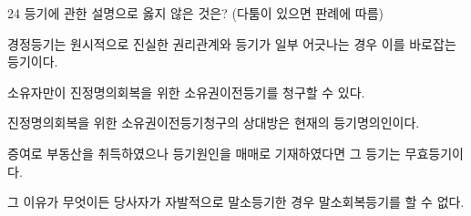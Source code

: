 \begin{question}{24}
등기에 관한 설명으로 옳지 않은 것은? (다툼이 있으면 판례에 따름)
\begin{choices}
  \item 경정등기는 원시적으로 진실한 권리관계와 등기가 일부 어긋나는 경우 이를 바로잡는 등기이다.
  \item 소유자만이 진정명의회복을 위한 소유권이전등기를 청구할 수 있다.
  \item 진정명의회복을 위한 소유권이전등기청구의 상대방은 현재의 등기명의인이다.
  \item 증여로 부동산을 취득하였으나 등기원인을 매매로 기재하였다면 그 등기는 무효등기이다.
  \item 그 이유가 무엇이든 당사자가 자발적으로 말소등기한 경우 말소회복등기를 할 수 없다.
\end{choices}
\end{question}
